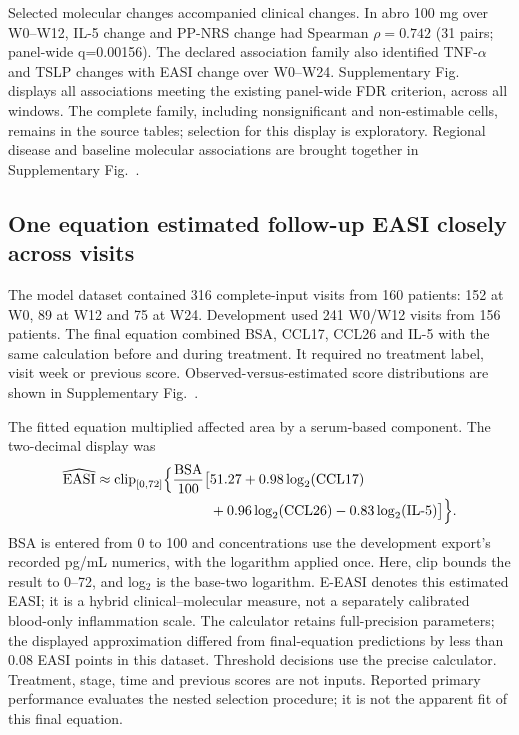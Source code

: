 Selected molecular changes accompanied clinical changes. In abro 100 mg over W0--W12, IL-5 change and PP-NRS change had Spearman $\rho=0.742$ (31 pairs; panel-wide q=0.00156). The declared association family also identified TNF-$\alpha$ and TSLP changes with EASI change over W0--W24. Supplementary Fig.~ displays all associations meeting the existing panel-wide FDR criterion, across all windows. The complete family, including nonsignificant and non-estimable cells, remains in the source tables; selection for this display is exploratory. Regional disease and baseline molecular associations are brought together in Supplementary Fig.~.

\subsection{One equation estimated follow-up EASI closely across visits}
The model dataset contained 316 complete-input visits from 160 patients: 152 at W0, 89 at W12 and 75 at W24. Development used 241 W0/W12 visits from 156 patients. The final equation combined BSA, CCL17, CCL26 and IL-5 with the same calculation before and during treatment. It required no treatment label, visit week or previous score. Observed-versus-estimated score distributions are shown in Supplementary Fig.~.

The fitted equation multiplied affected area by a serum-based component. The two-decimal display was
\begin{equation}
\begin{aligned}
\widehat{\mathrm{EASI}} \approx
\operatorname{clip}_{[0,72]}\Bigl\{\frac{\mathrm{BSA}}{100}
\bigl[&51.27+0.98\log_2(\mathrm{CCL17})\\
&+0.96\log_2(\mathrm{CCL26})
-0.83\log_2(\mathrm{IL\mbox{-}5})\bigr]\Bigr\}.
\end{aligned}
\label{eq:common}
\end{equation}
BSA is entered from 0 to 100 and concentrations use the development export's recorded pg/mL numerics, with the logarithm applied once. Here, clip bounds the result to 0--72, and log$_2$ is the base-two logarithm. E-EASI denotes this estimated EASI; it is a hybrid clinical--molecular measure, not a separately calibrated blood-only inflammation scale. The calculator retains full-precision parameters; the displayed approximation differed from final-equation predictions by less than 0.08 EASI points in this dataset. Threshold decisions use the precise calculator. Treatment, stage, time and previous scores are not inputs. Reported primary performance evaluates the nested selection procedure; it is not the apparent fit of this final equation.

